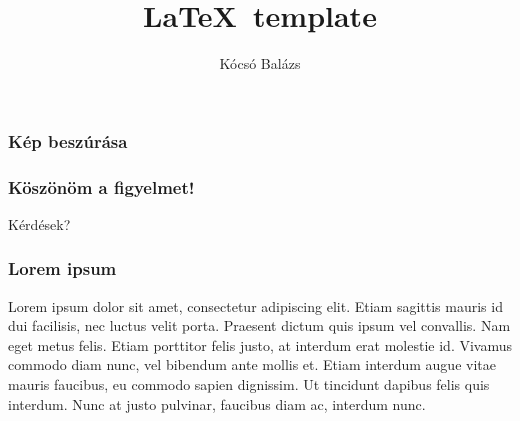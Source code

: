 \documentclass[aspectratio=43]{beamer}
\author{Kócsó Balázs}
\title{\LaTeX\ template}
\subtitle{}
\institute[]{
  \mbox{}\\ \bigskip
  \resizebox{6cm}{!}{\texttt{[image: bme\_logo\_white.png]}} \\
}
\begin{document}
\begin{frame}
\titlepage
\end{frame}

\begin{frame}[c]
\frametitle{Kép beszúrása}
\begin{center}
\end{center}
\end{frame}

\begin{frame}[c]
\frametitle{Köszönöm a figyelmet!}
\begin{center}
\Huge
Kérdések?
\end{center}
\end{frame}

\setcounter{finalframe}{\value{framenumber}}

\begin{frame}[t]
\frametitle{Lorem ipsum}
Lorem ipsum dolor sit amet, consectetur adipiscing elit. Etiam sagittis mauris id dui facilisis, nec luctus velit porta. Praesent dictum quis ipsum vel convallis. Nam eget metus felis. Etiam porttitor felis justo, at interdum erat molestie id. Vivamus commodo diam nunc, vel bibendum ante mollis et. Etiam interdum augue vitae mauris faucibus, eu commodo sapien dignissim. Ut tincidunt dapibus felis quis interdum. Nunc at justo pulvinar, faucibus diam ac, interdum nunc.
\end{frame}

\setcounter{framenumber}{\value{finalframe}}
\end{document}
